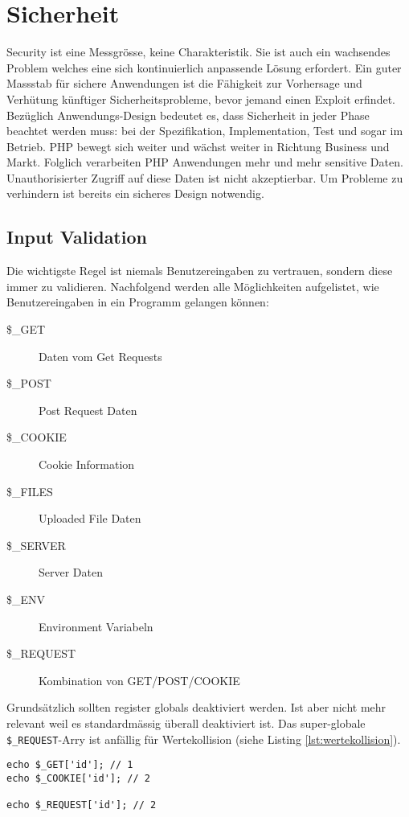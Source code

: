 \section{Sicherheit}

Security ist eine Messgrösse, keine Charakteristik. Sie ist auch ein wachsendes Problem welches eine sich kontinuierlich anpassende Lösung erfordert. Ein guter Massstab für sichere Anwendungen ist die Fähigkeit zur Vorhersage und Verhütung künftiger Sicherheitsprobleme, bevor jemand einen Exploit erfindet. Bezüglich Anwendungs-Design bedeutet es, dass Sicherheit in jeder Phase beachtet werden muss: bei der Spezifikation, Implementation, Test und sogar im Betrieb. PHP bewegt sich weiter und wächst weiter in Richtung Business und Markt. Folglich verarbeiten PHP Anwendungen mehr und mehr sensitive Daten. Unauthorisierter Zugriff auf diese Daten ist nicht akzeptierbar. Um Probleme zu verhindern ist bereits ein sicheres Design notwendig.

\subsection{Input Validation}

Die wichtigste Regel ist niemals Benutzereingaben zu vertrauen, sondern diese immer zu validieren. Nachfolgend werden alle Möglichkeiten aufgelistet, wie Benutzereingaben in ein Programm gelangen können:
\begin{description}
	\item[\$\_GET] Daten vom Get Requests
	\item[\$\_POST] Post Request Daten
	\item[\$\_COOKIE] Cookie Information
	\item[\$\_FILES] Uploaded File Daten
	\item[\$\_SERVER] Server Daten
	\item[\$\_ENV] Environment Variabeln
	\item[\$\_REQUEST] Kombination von GET/POST/COOKIE
\end{description}
Grundsätzlich sollten register globals deaktiviert werden. Ist aber nicht mehr relevant weil es standardmässig überall deaktiviert ist. Das super-globale \verb|$_REQUEST|-Arry ist anfällig für Wertekollision (siehe Listing \ref{lst:wertekollision}).

\begin{lstlisting}[caption=\$\_REQUEST Wertekollison, label=lst:wertekollision]
echo $_GET['id']; // 1
echo $_COOKIE['id']; // 2

echo $_REQUEST['id']; // 2
\end{lstlisting}

